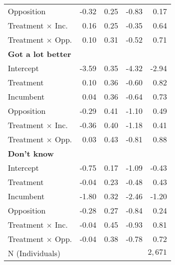 \begin{table}
\begin{tabular}[t]{l D{.}{.}{-1} D{.}{.}{-1} D{.}{.}{-1} D{.}{.}{-1} }
\textsf{Opposition} & -0.32 & 0.25 & -0.83 & 0.17\\
\textsf{Treatment $\times$ Inc.} & 0.16 & 0.25 & -0.35 & 0.64\\
\textsf{Treatment $\times$ Opp.} & 0.10 & 0.31 & -0.52 & 0.71\\
\textsf{\textbf{Got a lot better}} &  &  &  & \\
\textsf{Intercept} & -3.59 & 0.35 & -4.32 & -2.94\\
\textsf{Treatment} & 0.10 & 0.36 & -0.60 & 0.82\\
\textsf{Incumbent} & 0.04 & 0.36 & -0.64 & 0.73\\
\textsf{Opposition} & -0.29 & 0.41 & -1.10 & 0.49\\
\textsf{Treatment $\times$ Inc.} & -0.36 & 0.40 & -1.18 & 0.41\\
\textsf{Treatment $\times$ Opp.} & 0.03 & 0.43 & -0.81 & 0.88\\
\textsf{\textbf{Don't know}} &  &  &  & \\
\textsf{Intercept} & -0.75 & 0.17 & -1.09 & -0.43\\
\textsf{Treatment} & -0.04 & 0.23 & -0.48 & 0.43\\
\textsf{Incumbent} & -1.80 & 0.32 & -2.46 & -1.20\\
\textsf{Opposition} & -0.28 & 0.27 & -0.84 & 0.24\\
\textsf{Treatment $\times$ Inc.} & -0.04 & 0.45 & -0.93 & 0.81\\
\textsf{Treatment $\times$ Opp.} & -0.04 & 0.38 & -0.78 & 0.72\\
\midrule
\textsf{N (Individuals)} & \\
\bottomrule
\end{tabular}
\end{table}